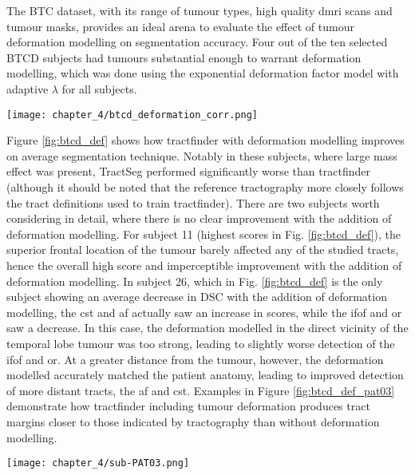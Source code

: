 The BTC dataset, with its range of tumour types, high quality \gls{dmri} scans and tumour masks, provides an ideal arena to evaluate the effect of tumour deformation modelling on segmentation accuracy.
Four out of the ten selected BTCD subjects had tumours substantial enough to warrant deformation modelling, which was done using the exponential deformation factor model with adaptive $\lambda$ for all subjects.

\begin{SCfigure}[][htb!]
  \texttt{[image: chapter\_4/btcd\_deformation\_corr.png]}
  \caption{Effect of deformation modelling on segmentation accuracy, compared to tractfinder without deformation modelling. Each heavy datapoint represents the average across tracts for a single subject, the light datapoints represent individual tracts. There are only three heavy contralateral datapoints because one of the four subjects had a midline tumour (all tracts considered ipsilateral).}
  \label{fig:btcd_def}
\end{SCfigure}

Figure \ref{fig:btcd_def} shows how tractfinder with deformation modelling improves on average segmentation technique.
Notably in these subjects, where large mass effect was present, TractSeg performed significantly worse than tractfinder (although it should be noted that the reference tractography more closely follows the tract definitions used to train tractfinder).
There are two subjects worth considering in detail, where there is no clear improvement with the addition of deformation modelling.
For subject 11 (highest scores in Fig. \ref{fig:btcd_def}), the superior frontal location of the tumour barely affected any of the studied tracts, hence the overall high score and imperceptible improvement with the addition of deformation modelling.
In subject 26, which in Fig. \ref{fig:btcd_def} is the only subject showing an average decrease in DSC with the addition of deformation modelling, the \gls{cst} and \gls{af} actually saw an increase in scores, while the \gls{ifof} and \gls{or} saw a decrease.
In this case, the deformation modelled in the direct vicinity of the temporal lobe tumour was too strong, leading to slightly worse detection of the \gls{ifof} and \gls{or}.
At a greater distance from the tumour, however, the deformation modelled accurately matched the patient anatomy, leading to improved detection of more distant tracts, the \gls{af} and \gls{cst}.
Examples in Figure \ref{fig:btcd_def_pat03} demonstrate how tractfinder including tumour deformation produces tract margins closer to those indicated by tractography than without deformation modelling.

\begin{SCfigure}[50][hb!]
  \texttt{[image: chapter\_4/sub-PAT03.png]}
  \caption{ Effect of deformation modelling on tractfinder accuracy demonstrated in BTCD subject sub-PAT03 with large parietal meningioma. Black outline: tractfinder without deformation modelling, orange: tractfinder after deformation modelling, white: tractography (3 streamline isosurface)}
  \label{fig:btcd_def_pat03}
\end{SCfigure}
